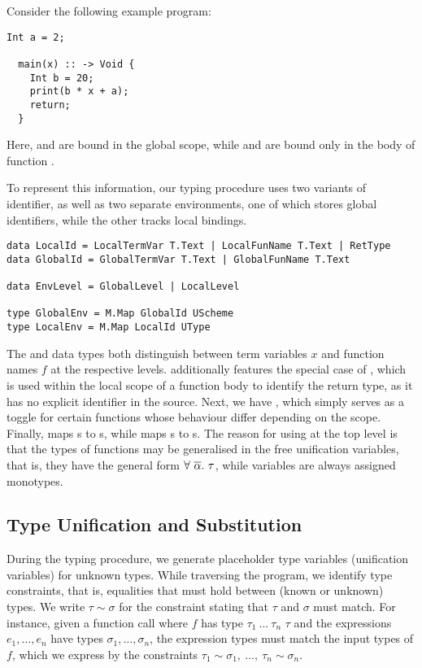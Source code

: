 Consider the following example program:
%
\begin{lstlisting}[language=SPL]
  Int a = 2;

  main(x) :: -> Void {
    Int b = 20;
    print(b * x + a);
    return;
  }
\end{lstlisting}
%
Here,  and  are bound in the global scope, while  and
 are bound only in the body of function .

To represent this information, our typing procedure uses two variants of
identifier, as well as two separate environments, one of which stores global
identifiers, while the other tracks local bindings.

\begin{verbatim}
data LocalId = LocalTermVar T.Text | LocalFunName T.Text | RetType
data GlobalId = GlobalTermVar T.Text | GlobalFunName T.Text

data EnvLevel = GlobalLevel | LocalLevel

type GlobalEnv = M.Map GlobalId UScheme
type LocalEnv = M.Map LocalId UType
\end{verbatim}

The  and  data types both distinguish between
term variables $x$ and function names $f$ at the respective levels.
 additionally features the special case of ,
which is used within the local scope of a function body to identify the return
type, as it has no explicit identifier in the source.
Next, we have , which simply serves as a toggle for certain
functions whose behaviour differ depending on the scope.
Finally,  maps s to s,
while  maps s to s.
The reason for using  at the top level is that the types of
functions may be generalised in the free unification variables, that is, they
have the general form $\forall\ \set{\alpha}.\ \tau$, while variables are always
assigned monotypes.


\subsection{Type Unification and Substitution} \label{sec:unification-substitution}

During the typing procedure, we generate placeholder type variables (unification
variables) for unknown types. While traversing the program, we identify type
constraints, that is, equalities that must hold between (known or unknown) types.
We write $\tau \sim \sigma$ for the constraint stating that $\tau$ and $\sigma$
must match. For instance, given a function call 
where $f$ has type $\tau_1\ ...\ \tau_n$ \spl{->} $\tau$ and the expressions
$e_1,\dots,e_n$ have types $\sigma_1,\dots,\sigma_n$, the expression types must
match the input types of $f$, which we express by the constraints $\tau_1 \sim
\sigma_1,\ \dots,\ \tau_n \sim \sigma_n$.

